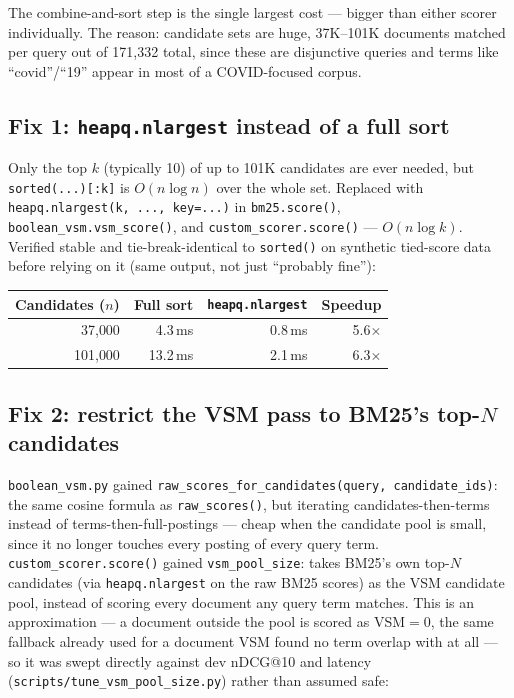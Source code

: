 \documentclass[11pt]{article}
\begin{document}
\noindent The combine-and-sort step is the single largest cost ---
bigger than either scorer individually. The reason: candidate sets are
huge, 37K--101K documents matched per query out of 171{,}332 total,
since these are disjunctive queries and terms like ``covid''/``19''
appear in most of a COVID-focused corpus.

\subsection{Fix 1: \texttt{heapq.nlargest} instead of a full sort}
Only the top $k$ (typically 10) of up to 101K candidates are ever
needed, but \texttt{sorted(...)[:k]} is $O(n \log n)$ over the whole set.
Replaced with \texttt{heapq.nlargest(k, ..., key=...)} in
\texttt{bm25.score()}, \texttt{boolean\_vsm.vsm\_score()}, and
\texttt{custom\_scorer.score()} --- $O(n \log k)$. Verified stable and
tie-break-identical to \texttt{sorted()} on synthetic tied-score data
before relying on it (same output, not just ``probably fine''):

\begin{table}[h]
\centering
\begin{tabular}{rrrr}
\toprule
Candidates ($n$) & Full sort & \texttt{heapq.nlargest} & Speedup \\
\midrule
37{,}000 & 4.3\,ms & 0.8\,ms & 5.6$\times$ \\
101{,}000 & 13.2\,ms & 2.1\,ms & 6.3$\times$ \\
\bottomrule
\end{tabular}
\end{table}

\subsection{Fix 2: restrict the VSM pass to BM25's top-$N$ candidates}
\texttt{boolean\_vsm.py} gained
\texttt{raw\_scores\_for\_candidates(query, candidate\_ids)}: the same
cosine formula as \texttt{raw\_scores()}, but iterating
candidates-then-terms instead of terms-then-full-postings --- cheap when
the candidate pool is small, since it no longer touches every posting of
every query term. \texttt{custom\_scorer.score()} gained
\texttt{vsm\_pool\_size}: takes BM25's own top-$N$ candidates (via
\texttt{heapq.nlargest} on the raw BM25 scores) as the VSM candidate
pool, instead of scoring every document any query term matches. This is
an approximation --- a document outside the pool is scored as VSM$=0$,
the same fallback already used for a document VSM found no term overlap
with at all --- so it was swept directly against dev nDCG@10 and latency
(\texttt{scripts/tune\_vsm\_pool\_size.py}) rather than assumed safe:
\end{document}
